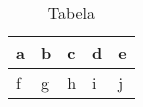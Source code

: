 \begin{table}[htbp]
\centering
\begin{tabular}{|l|l|l|l|l|}
\hline
a & b & c & d & e \\ \hline
f & g & h & i & j \\ \hline
\end{tabular}
\caption{Tabela}
\label{tab:5_tabela}
\end{table}